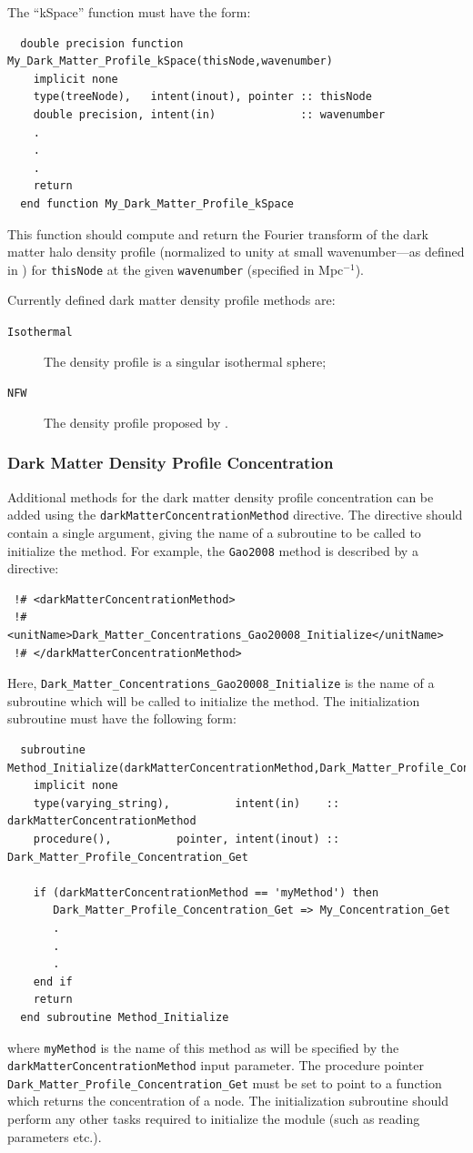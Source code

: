 The ``kSpace'' function must have the form:
\begin{verbatim}
  double precision function My_Dark_Matter_Profile_kSpace(thisNode,wavenumber)
    implicit none
    type(treeNode),   intent(inout), pointer :: thisNode
    double precision, intent(in)             :: wavenumber
    .
    .
    .
    return
  end function My_Dark_Matter_Profile_kSpace
\end{verbatim}
This function should compute and return the Fourier transform of the dark matter halo density profile (normalized to unity at small wavenumber---as defined in \citealt{cooray_halo_2002}) for {\tt thisNode} at the given {\tt wavenumber} (specified in Mpc$^{-1}$).

Currently defined dark matter density profile methods are:
\begin{description}
 \item [{\tt Isothermal}] The density profile is a singular isothermal sphere;
 \item [{\tt NFW}] The density profile proposed by \cite{navarro_universal_1997}.
\end{description}

\subsubsection{Dark Matter Density Profile Concentration}

Additional methods for the dark matter density profile concentration can be added using the {\tt darkMatterConcentrationMethod} directive. The directive should contain a single argument, giving the name of a subroutine to be called to initialize the method. For example, the {\tt Gao2008} method is described by a directive:
\begin{verbatim}
 !# <darkMatterConcentrationMethod>
 !#  <unitName>Dark_Matter_Concentrations_Gao20008_Initialize</unitName>
 !# </darkMatterConcentrationMethod>
\end{verbatim}
Here, {\tt Dark\_Matter\_Concentrations\_Gao20008\_Initialize} is the name of a subroutine which will be called to initialize the method. The initialization subroutine must have the following form:
\begin{verbatim}
  subroutine Method_Initialize(darkMatterConcentrationMethod,Dark_Matter_Profile_Concentration_Get)
    implicit none
    type(varying_string),          intent(in)    :: darkMatterConcentrationMethod
    procedure(),          pointer, intent(inout) :: Dark_Matter_Profile_Concentration_Get
    
    if (darkMatterConcentrationMethod == 'myMethod') then
       Dark_Matter_Profile_Concentration_Get => My_Concentration_Get
       .
       .
       .
    end if
    return
  end subroutine Method_Initialize
\end{verbatim}
where {\tt myMethod} is the name of this method as will be specified by the {\tt darkMatterConcentrationMethod} input parameter. The procedure pointer {\tt Dark\_Matter\_Profile\_Concentration\_Get} must be set to point to a function which returns the concentration of a node. The initialization subroutine should perform any other tasks required to initialize the module (such as reading parameters etc.).

